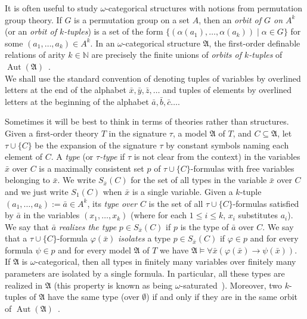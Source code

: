 \documentclass{amsart}
\theoremstyle{definition}
\theoremstyle{remark}
\numberwithin{equation}{section}
\newcommand{\fa}{\mathfrak{A}}
\newcommand{\Aut}{\operatorname{Aut}}
\begin{document}
    It is often useful to study $\omega$-categorical structures with notions from permutation group theory. 
    If $G$ is a permutation group on a set $A$, then
    an \emph{orbit of $G$ on $A^k$} (or an \emph{orbit of $k$-tuples}) is a set of the form
    $\{(\alpha(a_1),\dots,\alpha(a_k)) \mid \alpha \in G\}$ for some $(a_1,\dots,a_k) \in A^k$. 
   In an $\omega$-categorical structure $\fa$, the first-order definable relations of arity $k \in {\mathbb N}$ are precisely the finite unions of \emph{orbits of $k$-tuples} of $\Aut(\fa)$~\cite[Corollary 7.3.5]{HodgesLong}.\\

   We shall use the standard convention of denoting tuples of variables by overlined letters at the end of the alphabet $\bar{x},\bar{y},\bar{z},\dots$ and tuples of elements by overlined letters at the beginning of the alphabet $\bar{a},\bar{b},\bar{c}\dots$.

   Sometimes it will be best to think in terms of theories rather than structures. Given a first-order theory $T$ in the signature $\tau$, a model $\fa$  of $T$, and $C\subseteq\fa$, let $\tau\cup\{C\}$ be the expansion of the {signature} $\tau$ by constant symbols naming each element of $C$. A \emph{type} (or \emph{$\tau$-type} if $\tau$ is not clear from the context)  in the variables $\bar{x}$ over $C$ is a maximally consistent set $p$ of $\tau\cup\{C\}$-formulas with free variables belonging to $\bar{x}$. We write $S_{\bar{x}}(C)$ for the set of all types in the variable $\bar{x}$ over $C$ and we just write $S_1(C)$ when $\bar{x}$ is a single variable. Given a $k$-tuple $(a_1, \dots, a_k):=\bar{a}\in A^k$, its \emph{type over $C$} is the set of all $\tau\cup\{C\}$-formulas satisfied by $\bar{a}$ in the variables $(x_1, \dots, x_k)$ (where for each $1\leq i\leq k$, $x_i$ substitutes $a_i$). We say that $\bar{a}$ \emph{realizes the type} $p\in S_{\bar{x}}(C)$ if $p$ is the type of $\bar{a}$ over $C$. We say that a $\tau\cup\{C\}$-formula $\varphi(\bar{x})$ \emph{isolates} a type $p\in S_{\bar{x}}(C)$ if $\varphi\in p$ and for every formula $\psi\in p$ and for every model $\fa$ of $T$ we have $\fa\models \forall \bar{x}(\varphi (\bar{x})\rightarrow \psi(\bar{x}))$.
   If $\fa$ is $\omega$-categorical, then all types in finitely many variables over finitely many parameters are isolated by a single formula. In particular, all these types are
   realized in $\fa$ (this property is known as being $\omega$-saturated~\cite[Exercise 7.2.11]{HodgesLong}). Moreover, two $k$-tuples of $\fa$ have the same type (over $\emptyset$) if and only if they are in the same orbit of $\Aut(\fa)$~\cite[Corollary 7.3.3]{HodgesLong}.
   
\end{document}
